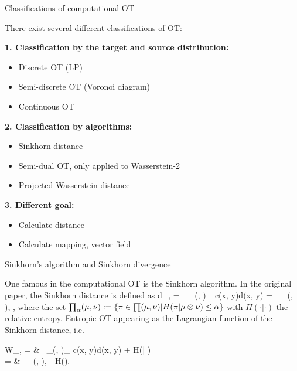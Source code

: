 \documentclass{beamer}
\begin{document}
\begin{frame}{Classifications of computational OT}
\par
There exist several different classifications of OT:
\par
\textbf{1. Classification by the target and source distribution:}
\begin{itemize}
	\item Discrete OT (LP)
	\item Semi-discrete OT (Voronoi diagram)
	\item Continuous OT
\end{itemize}
\par
\textbf{2. Classification by algorithms:}
\begin{itemize}
	\item Sinkhorn distance
	\item Semi-dual OT, only applied to Wasserstein-2
	\item Projected Wasserstein distance
\end{itemize}
\par
\textbf{3. Different goal:}
\begin{itemize}
	\item Calculate distance
	\item Calculate mapping, vector field
\end{itemize}
\end{frame}


\begin{frame}{Sinkhorn's algorithm and Sinkhorn divergence}
\par
One famous in the computational OT is the Sinkhorn algorithm. In the original paper\footnotemark, the Sinkhorn distance is defined as 
	\bequ
		d_{\alpha}\lp \mu, \nu \rp = \min_{\pi \in \prod_{\alpha}(\mu, \nu)}\lbb \int_{\mcX \times \mcY} c(x, y)d\pi(x, y) \rbb = \min_{\mfP \in \prod_{\alpha}(\mu, \nu)}\la \mfC, \mfP \ra,
	\eequ
	where the set $\prod_{\alpha}(\mu, \nu) := \left\{ \pi \in \prod(\mu, \nu) | H(\pi | \mu \otimes \nu) \leq \alpha \right\}$ with $H(\cdot | \cdot)$ the relative entropy. Entropic OT appearing as the Lagrangian function of the Sinkhorn distance, i.e.
	\bequ
		\begin{aligned}
		W_{\epsilon}\lp \mu, \nu \rp = & \ \min_{\pi \in \prod(\mu, \nu)}\lbb \int_{\mcX \times \mcY} c(x, y)d\pi(x, y) + \epsilon H(\pi | \mu \otimes \nu) \rbb \\
		= & \ \min_{\mfP \in \prod(\mu, \nu)}\la \mfC, \mfP \ra - \epsilon H(\mfP).
		\end{aligned}
	\eequ
{}
\end{frame}
\end{document}
